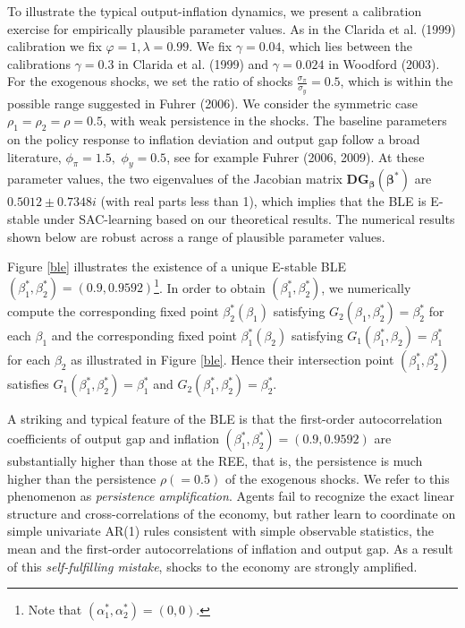 To illustrate the typical output-inflation dynamics, we present a calibration exercise for empirically plausible parameter values. 
%
As in the Clarida et al. (1999) calibration we fix $\varphi=1, \lambda=0.99$. We fix $\gamma=0.04$, which lies between the calibrations $\gamma=0.3$ in Clarida et al. (1999) and $\gamma=0.024$ in Woodford (2003).
For the exogenous shocks, we set the ratio of shocks $\frac{\sigma_{\pi}}{\sigma_y}=0.5$, which is within the possible range suggested in Fuhrer (2006). %
We consider the symmetric case $\rho_1=\rho_2=\rho=0.5$, with weak persistence in the shocks. The baseline parameters on the policy response to inflation deviation and output gap follow a broad literature, $\phi_\pi=1.5, \,\,\phi_y=0.5$, see for example Fuhrer (2006, 2009). At these parameter values, the two eigenvalues of the Jacobian matrix $\pmb D\pmb G_{\pmb\beta}(\pmb\beta^*)$ are  $0.5012 \pm 0.7348i$ (with real parts less than 1), which implies that the BLE is E-stable under SAC-learning based on our theoretical results. The numerical results shown below are robust across a range of plausible parameter values. 

Figure \ref{ble} illustrates the existence of a unique E-stable BLE $(\beta_1^*, \beta_2^*)=(0.9, 0.9592)$\footnote {Note that $(\alpha_1^*, \alpha_2^*)=(0,0)$. }. In order to obtain $(\beta_1^*, \beta_2^*)$, we numerically compute the corresponding fixed point $\beta_2^*(\beta_1)$ satisfying $G_2(\beta_1, \beta_2^*)=\beta_2^*$ for each $\beta_1$ and the corresponding fixed point $\beta_1^*(\beta_2)$ satisfying $G_1(\beta_1^*, \beta_2)=\beta_1^*$ for each $\beta_2$ as illustrated in Figure  \ref{ble}. %
Hence their intersection point $(\beta_1^*, \beta_2^*)$ satisfies $G_1(\beta_1^*,\beta_2^*)=\beta_1^*$ and $G_2(\beta_1^*,\beta_2^*)=\beta_2^*$.



A striking and typical feature of the BLE is that the first-order autocorrelation coefficients of output gap and inflation $(\beta_1^*, \beta_2^*)=(0.9, 0.9592)$ are substantially higher than those at the REE, that is, the persistence is much higher than the persistence $\rho (=0.5)$ of the exogenous shocks. We refer to this phenomenon as {\it persistence amplification}. Agents fail to recognize the exact linear structure and cross-correlations of the economy, but rather learn to coordinate on simple univariate AR(1) rules consistent with simple observable statistics, the mean and the first-order autocorrelations of inflation and output gap. As a result of this {\it self-fulfilling mistake}, shocks to the economy are strongly amplified.



